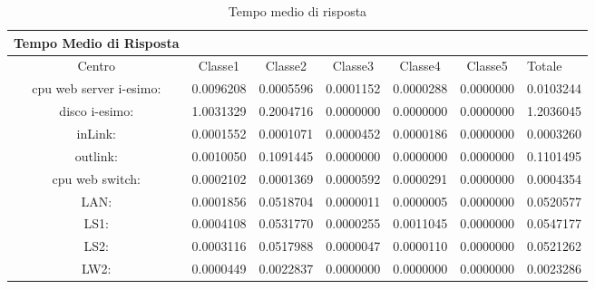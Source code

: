 \begin{table}[htbp]
\begin{center}
\begin{tabular}{||c|c|c|c|c|c||}
\hline
Tempo Medio di Risposta\\
\hline
Centro &Classe1 &Classe2 &Classe3 &Classe4 &Classe5 &Totale\\
\hline
\hline
 cpu web server i-esimo: 	&0.0096208	&0.0005596	&0.0001152	&0.0000288	&0.0000000	&0.0103244\\
\hline
 disco i-esimo: 	&1.0031329	&0.2004716	&0.0000000	&0.0000000	&0.0000000	&1.2036045\\
\hline
 inLink: 	&0.0001552	&0.0001071	&0.0000452	&0.0000186	&0.0000000	&0.0003260\\
\hline
 outlink: 	&0.0010050	&0.1091445	&0.0000000	&0.0000000	&0.0000000	&0.1101495\\
\hline
 cpu web switch: 	&0.0002102	&0.0001369	&0.0000592	&0.0000291	&0.0000000	&0.0004354\\
\hline
 LAN: 	&0.0001856	&0.0518704	&0.0000011	&0.0000005	&0.0000000	&0.0520577\\
\hline
 LS1: 	&0.0004108	&0.0531770	&0.0000255	&0.0011045	&0.0000000	&0.0547177\\
\hline
 LS2: 	&0.0003116	&0.0517988	&0.0000047	&0.0000110	&0.0000000	&0.0521262\\
\hline
 LW2: 	&0.0000449	&0.0022837	&0.0000000	&0.0000000	&0.0000000	&0.0023286\\
\hline
\end{tabular}
\end{center}
\caption{Tempo medio di risposta}
\label{tempomediodirisposta}
\end{table}

